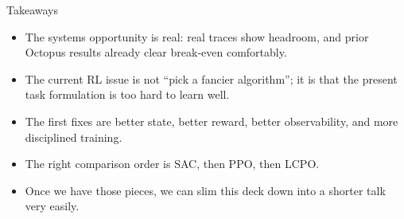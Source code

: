 \documentclass[10pt,aspectratio=169]{beamer}
\begin{document}
\begin{frame}{Takeaways}
  \begin{itemize}
    \item The systems opportunity is real: real traces show headroom, and prior Octopus results already clear break-even comfortably.
    \item The current RL issue is not ``pick a fancier algorithm''; it is that the present task formulation is too hard to learn well.
    \item The first fixes are better state, better reward, better observability, and more disciplined training.
    \item The right comparison order is SAC, then PPO, then LCPO.
    \item Once we have those pieces, we can slim this deck down into a shorter talk very easily.
  \end{itemize}
\end{frame}
\end{document}
